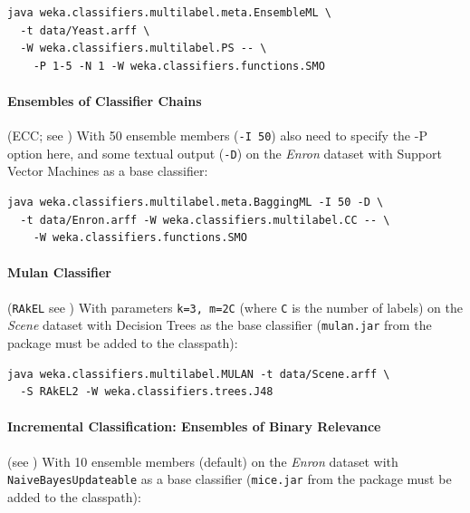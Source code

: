 \documentclass[11pt]{article}
\newcommand{\MEKA}{Meka}
\newcommand{\MULAN}{Mulan}
\begin{document}
\begin{verbatim}
java weka.classifiers.multilabel.meta.EnsembleML \
  -t data/Yeast.arff \
  -W weka.classifiers.multilabel.PS -- \
    -P 1-5 -N 1 -W weka.classifiers.functions.SMO
\end{verbatim}

\paragraph{Ensembles of Classifier Chains} (ECC; see \cite{ECC2}) With 50 ensemble members (\texttt{-I 50}) {\blue also need to specify the -P option here}, and some textual output (\texttt{-D}) on the \textit{Enron} dataset with Support Vector Machines as a base classifier:
\begin{verbatim}
java weka.classifiers.multilabel.meta.BaggingML -I 50 -D \
  -t data/Enron.arff -W weka.classifiers.multilabel.CC -- \
    -W weka.classifiers.functions.SMO
\end{verbatim}

\paragraph{Mulan Classifier} (\texttt{RAkEL} see \cite{RAKEL}) With parameters \texttt{\texttt{k=3}, \texttt{m=2C}} (where \texttt{C} is the number of labels) on the \textit{Scene} dataset with Decision Trees as the base classifier ({\texttt{mulan.jar} from the \framework{\MULAN} package must be added to the classpath}):
\begin{verbatim}
java weka.classifiers.multilabel.MULAN -t data/Scene.arff \ 
  -S RAkEL2 -W weka.classifiers.trees.J48
\end{verbatim}



\paragraph{Incremental Classification: Ensembles of Binary Relevance} (see \cite{ECC2,MEDS2}) With 10 ensemble members (default) on the \textit{Enron} dataset with \texttt{NaiveBayesUpdateable} as a base classifier (\texttt{mice.jar} from the \framework{\MEKA} package must be added to the classpath):
\end{document}
